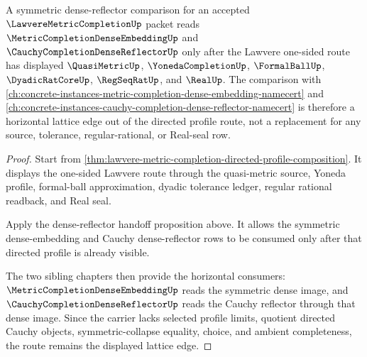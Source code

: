 \begin{theorem}
\label{thm:lawvere-metric-completion-cauchy-route}
A symmetric dense-reflector comparison for an accepted $\LawvereMetricCompletionUp$ packet reads $\MetricCompletionDenseEmbeddingUp$ and $\CauchyCompletionDenseReflectorUp$ only after the Lawvere one-sided route has displayed $\QuasiMetricUp$, $\YonedaCompletionUp$, $\FormalBallUp$, $\DyadicRatCoreUp$, $\RegSeqRatUp$, and $\RealUp$. The comparison with \autoref{ch:concrete-instances-metric-completion-dense-embedding-namecert} and \autoref{ch:concrete-instances-cauchy-completion-dense-reflector-namecert} is therefore a horizontal lattice edge out of the directed profile route, not a replacement for any source, tolerance, regular-rational, or Real-seal row.
\end{theorem}
\begin{proof}
Start from \autoref{thm:lawvere-metric-completion-directed-profile-composition}. It displays the one-sided Lawvere route through the quasi-metric source, Yoneda profile, formal-ball approximation, dyadic tolerance ledger, regular rational readback, and Real seal.

Apply the dense-reflector handoff proposition above. It allows the symmetric dense-embedding and Cauchy dense-reflector rows to be consumed only after that directed profile is already visible.

The two sibling chapters then provide the horizontal consumers: $\MetricCompletionDenseEmbeddingUp$ reads the symmetric dense image, and $\CauchyCompletionDenseReflectorUp$ reads the Cauchy reflector through that dense image. Since the carrier lacks selected profile limits, quotient directed Cauchy objects, symmetric-collapse equality, choice, and ambient completeness, the route remains the displayed lattice edge.
\end{proof}

